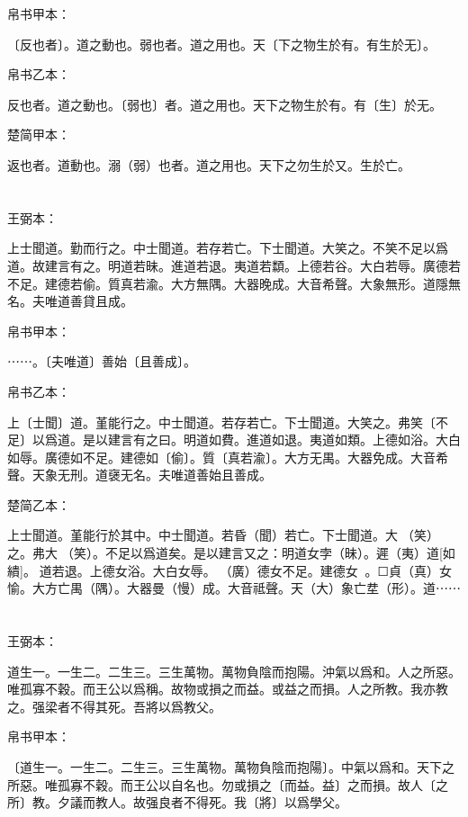 \documentclass[a5paper]{ctexbook}
\begin{document}
    
    帛书甲本：

    〔反也者〕。道之動也。弱也者。道之用也。天〔下之物生於有。有生於无〕。

    帛书乙本：

    反也者。道之動也。〔弱也〕者。道之用也。天下之物生於有。有〔生〕於无。

    楚简甲本：

    返也者。道動也。溺（弱）也者。道之用也。天下之勿生於又。生於亡。

    \chapter{}
    王弼本：

    上士聞道。勤而行之。中士聞道。若存若亡。下士聞道。大笑之。不笑不足以爲道。故建言有之。明道若昧。進道若退。夷道若纇。上德若谷。大白若辱。廣德若不足。建德若偷。質真若渝。大方無隅。大器晚成。大音希聲。大象無形。道隱無名。夫唯道善貸且成。

    
    帛书甲本：

    ⋯⋯。〔夫唯道〕善始〔且善成〕。

    帛书乙本：

    上〔士聞〕道。堇能行之。中士聞道。若存若亡。下士聞道。大笑之。弗笑〔不足〕以爲道。是以建言有之曰。明道如費。進道如退。夷道如類。上德如浴。大白如辱。廣德如不足。建德如〔偷〕。質〔真若渝〕。大方无禺。大器免成。大音希聲。天象无刑。道襃无名。夫唯道善始且善成。

    楚简乙本：

    上士聞道。堇能行於其中。中士聞道。若昏（聞）若亡。下士聞道。大𦬫（笑）之。弗大𦬫（笑）。不足以爲道矣。是以建言又之：明道女孛（昧）。遲（夷）道[如繢]。☐道若退。上德女浴。大白女辱。󼧊（廣）德女不足。建德女󲳴☐。☐貞（真）女愉。大方亡禺（隅）。大器曼（慢）成。大音祗聲。天（大）象亡坓（形）。道⋯⋯

    \chapter{}
    王弼本：

    道生一。一生二。二生三。三生萬物。萬物負陰而抱陽。沖氣以爲和。人之所惡。唯孤寡不穀。而王公以爲稱。故物或損之而益。或益之而損。人之所教。我亦教之。强梁者不得其死。吾將以爲教父。

    
    帛书甲本：

    〔道生一。一生二。二生三。三生萬物。萬物負陰而抱陽〕。中氣以爲和。天下之所惡。唯孤寡不穀。而王公以自名也。勿或損之〔而益。益〕之而損。故人〔之所〕教。夕議而教人。故强良者不得死。我〔將〕以爲學父。
\end{document}
